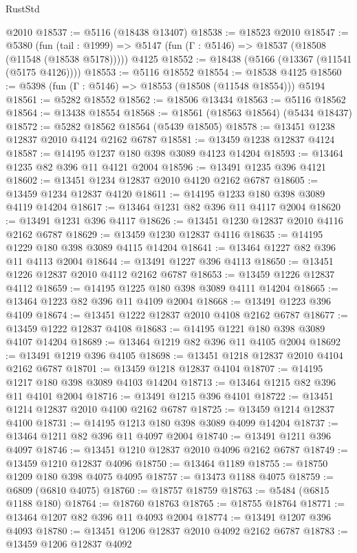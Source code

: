 \begin{lexlean}{RustStd}
\begin{coremodule}
{\begin{coremodule}
{{{{{{{{{{{{{{{{{{{{{{{{{{{{{{{    @2010
@18537 := @5116 (@18438 @13407)
@18538 := @18523 @2010
@18547 := @5380
    (fun (tail : @1999) => @5147 (fun (Γ : @5146) => @18537 (@18508 (@11548 (@18538 @5178)))))
    @4125
@18552 := @18438 (@5166 (@13367 (@11541 (@5175 @4126))))
@18553 := @5116 @18552
@18554 := @18538 @4125
@18560 := @5398 (fun (Γ : @5146) => @18553 (@18508 (@11548 @18554))) @5194
@18561 := @5282 @18552
@18562 := @18506 @13434
@18563 := @5116 @18562
@18564 := @13438 @18554
@18568 := @18561 (@18563 @18564) (@5434 @18437)
@18572 := @5282 @18562 @18564 (@5439 @18505)
@18578 := @13451 @1238 @12837 @2010 @4124 @2162 @6787
@18581 := @13459 @1238 @12837 @4124
@18587 := @14195 @1237 @180 @398 @3089 @4123 @14204
@18593 := @13464 @1235 @82 @396 @11 @4121 @2004
@18596 := @13491 @1235 @396 @4121
@18602 := @13451 @1234 @12837 @2010 @4120 @2162 @6787
@18605 := @13459 @1234 @12837 @4120
@18611 := @14195 @1233 @180 @398 @3089 @4119 @14204
@18617 := @13464 @1231 @82 @396 @11 @4117 @2004
@18620 := @13491 @1231 @396 @4117
@18626 := @13451 @1230 @12837 @2010 @4116 @2162 @6787
@18629 := @13459 @1230 @12837 @4116
@18635 := @14195 @1229 @180 @398 @3089 @4115 @14204
@18641 := @13464 @1227 @82 @396 @11 @4113 @2004
@18644 := @13491 @1227 @396 @4113
@18650 := @13451 @1226 @12837 @2010 @4112 @2162 @6787
@18653 := @13459 @1226 @12837 @4112
@18659 := @14195 @1225 @180 @398 @3089 @4111 @14204
@18665 := @13464 @1223 @82 @396 @11 @4109 @2004
@18668 := @13491 @1223 @396 @4109
@18674 := @13451 @1222 @12837 @2010 @4108 @2162 @6787
@18677 := @13459 @1222 @12837 @4108
@18683 := @14195 @1221 @180 @398 @3089 @4107 @14204
@18689 := @13464 @1219 @82 @396 @11 @4105 @2004
@18692 := @13491 @1219 @396 @4105
@18698 := @13451 @1218 @12837 @2010 @4104 @2162 @6787
@18701 := @13459 @1218 @12837 @4104
@18707 := @14195 @1217 @180 @398 @3089 @4103 @14204
@18713 := @13464 @1215 @82 @396 @11 @4101 @2004
@18716 := @13491 @1215 @396 @4101
@18722 := @13451 @1214 @12837 @2010 @4100 @2162 @6787
@18725 := @13459 @1214 @12837 @4100
@18731 := @14195 @1213 @180 @398 @3089 @4099 @14204
@18737 := @13464 @1211 @82 @396 @11 @4097 @2004
@18740 := @13491 @1211 @396 @4097
@18746 := @13451 @1210 @12837 @2010 @4096 @2162 @6787
@18749 := @13459 @1210 @12837 @4096
@18750 := @13464 @1189
@18755 := @18750 @1209 @180 @398 @4075 @4095
@18757 := @13473 @1188 @4075
@18759 := @6809 (@6810 @4075)
@18760 := @18757 @18759
@18763 := @5484 (@6815 @1188 @180)
@18764 := @18760 @18763
@18765 := @18755 @18764
@18771 := @13464 @1207 @82 @396 @11 @4093 @2004
@18774 := @13491 @1207 @396 @4093
@18780 := @13451 @1206 @12837 @2010 @4092 @2162 @6787
@18783 := @13459 @1206 @12837 @4092
}}}}}}}}}}}}}}}}}}}}}}}}}}}}}}}
\end{coremodule}}
\end{coremodule}
\end{lexlean}
